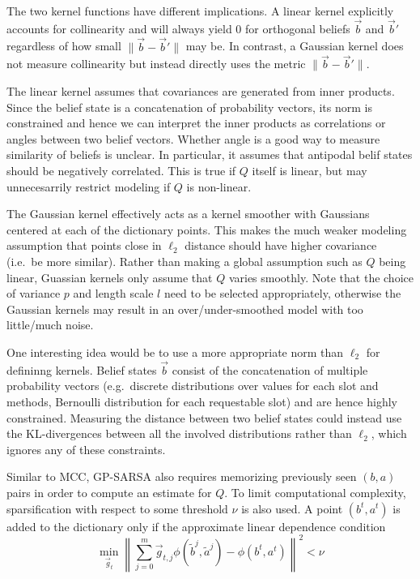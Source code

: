 \documentclass[a4paper,oneside,reqno]{amsart}
\begin{document}
The two kernel functions have different implications. A linear kernel explicitly accounts
for collinearity and will always yield $0$ for orthogonal beliefs $\vec{b}$ and $\vec{b}'$
regardless of how small $\|\vec{b} - \vec{b}'\|$ may be. In contrast, a Gaussian kernel
does not measure collinearity but instead directly uses the metric $\|\vec{b} - \vec{b}'\|$.

The linear kernel assumes that covariances are generated from inner products. Since the belief
state is a concatenation of probability vectors, its norm is constrained and hence
we can interpret the inner products as correlations or angles between two belief vectors. Whether
angle is a good way to measure similarity of beliefs is unclear. In particular, it assumes
that antipodal belif states should be negatively correlated. This is true if $Q$ itself is linear,
but may unnecesarrily restrict modeling if $Q$ is non-linear.

The Gaussian kernel effectively acts as a kernel smoother with Gaussians
centered at each of the dictionary points. This makes the much weaker modeling
assumption that points close in $\ell_2$ distance should have higher covariance
(i.e.\ be more similar).  Rather than making a global assumption such as $Q$
being linear, Guassian kernels only assume that $Q$ varies smoothly. Note that
the choice of variance $p$ and length scale $l$ need to be selected
appropriately, otherwise the Gaussian kernels may result in an
over/under-smoothed model with too little/much noise.

One interesting idea would be to use a more appropriate norm than $\ell_2$ for
defininng kernels. Belief states $\vec{b}$ consist of the concatenation of
multiple probability vectors (e.g.\ discrete distributions over values for each
slot and methods, Bernoulli distribution for each requestable slot) and are
hence highly constrained. Measuring the distance between two belief states
could instead use the KL-divergences between all the involved distributions
rather than $\ell_2$, which ignores any of these constraints.

Similar to MCC, GP-SARSA also requires memorizing previously seen $(b,a)$ pairs
in order to compute an estimate for $Q$. To limit computational complexity,
sparsification with respect to some threshold $\nu$ is also used. A point
$(b^t, a^t)$ is added to the dictionary only if the approximate linear dependence condition
\begin{equation}
  \label{eq:ald}
  \min_{\vec{g}_t}
  \left\|
  \sum_{j=0}^m \vec{g}_{t,j} \phi(\tilde{b}^j, \tilde{a}^j) - \phi(b^t, a^t)
  \right\|^2
  < \nu
\end{equation}
\end{document}
